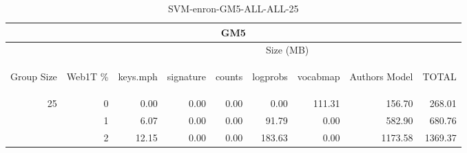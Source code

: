 \begin{center}
\begin{table}[htbp] 
 \begin{center}
\begin{tabular}{ | r | r | r | r | r | r | r | r | r |}
\hline
\multicolumn{9}{|c|}{GM5}\\
\hline
 & & \multicolumn{7}{|c|}{Size (MB)}\\ \cline{3-9}
\begin{sideways}Group Size\end{sideways} & \begin{sideways}Web1T \% \end{sideways} & \begin{sideways}keys.mph\end{sideways} & \begin{sideways}signature\end{sideways} & \begin{sideways}counts\end{sideways} & \begin{sideways}logprobs\end{sideways} & \begin{sideways}vocabmap\end{sideways} & \begin{sideways}Authors Model \end{sideways} & \begin{sideways}TOTAL\end{sideways}\\
\hline
\multirow{2}{*}{25}
 & 0 & 0.00 & 0.00 & 0.00 & 0.00 & 111.31 & 156.70 & 268.01\\ \cline{2-9}
 & 1 & 6.07 & 0.00 & 0.00 & 91.79 & 0.00 & 582.90 & 680.76\\ \cline{2-9}
 & 2 & 12.15 & 0.00 & 0.00 & 183.63 & 0.00 & 1173.58 & 1369.37\\ \cline{2-9}
\hline
\end{tabular}
\caption{SVM-enron-GM5-ALL-ALL-25}
\label{table:SVM-enron-GM5-ALL-ALL-25}
\end{center}
 \end{table}
\end{center}

